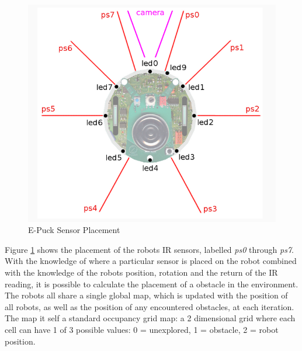 \begin{figure}[h]
\begin{center}
\includegraphics[scale=0.4]{Chapter1/images/e_puck_sensor.png}
\caption[E-Puck Sensor Placement]{E-Puck Sensor Placement\footnotemark}
\label{fig:sensor_placement} 
\end{center}
\end{figure}
Figure \ref{fig:sensor_placement} shows the placement of the robots IR sensors, labelled \textit{ps0} through \textit{ps7}.
With the knowledge of where a particular sensor is placed on the robot combined with the knowledge of the robots position, rotation and the return of the IR reading, it is possible to calculate the placement of a obstacle in the environment.\\

The robots all share a single global map, which is updated with the position of all robots, as well as the position of any encountered obstacles, at each iteration. 
The map it self a standard occupancy grid map: a 2 dimensional grid where each cell can have 1 of 3 possible values: 0 = unexplored, 1 = obstacle, 2 = robot position.  

